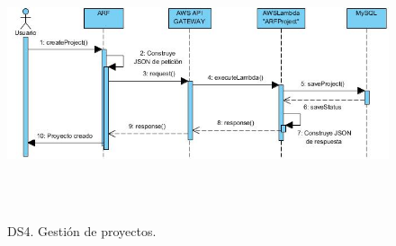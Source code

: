 \begin{figure}[h!]
	\centering
	\includegraphics[width=14cm,height=8cm]{imagenes/analisis/ds/CreateProject.jpg}
	\caption{DS4. Gestión de proyectos.}
	\label{fig:dsreccuenta}
\end{figure}
\clearpage


